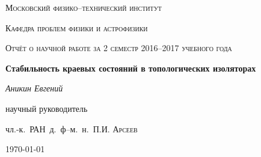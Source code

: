 \begin{titlepage}
	\centering
	{\scshape\LARGE Московский физико--технический институт\par}
	{\scshape Кафедра проблем физики и астрофизики \par}
	\vspace{1cm}
	{\scshape\Large Отчёт о научной работе за 2 семестр 2016--2017 учебного года\par}
	\vspace{1.5cm}
	{\huge\bfseries Стабильность краевых состояний в топологических изоляторах
        \par}

	\vspace{2cm}
	{\Large\itshape Аникин Евгений\par}
	\vfill
	научный руководитель\par
	чл.-к.~РАН~д.~ф--м.~н.~П.И. \textsc{Арсеев}

	\vfill

	{\large \today\par}
\end{titlepage}
